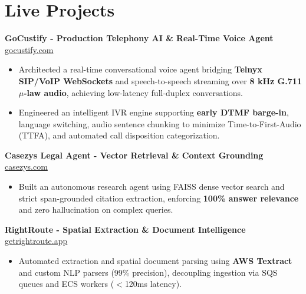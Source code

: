 \documentclass[9.5pt,a4paper]{article}
\begin{document}
\section*{Live Projects}
\noindent
\textbf{GoCustify - Production Telephony AI \& Real-Time Voice Agent} \hfill \href{https://gocustify.com}{gocustify.com}
\begin{itemize}
    \item Architected a real-time conversational voice agent bridging \textbf{Telnyx SIP/VoIP WebSockets} and speech-to-speech streaming over \textbf{8 kHz G.711 $\mu$-law audio}, achieving low-latency full-duplex conversations.
    \item Engineered an intelligent IVR engine supporting \textbf{early DTMF barge-in}, language switching, audio sentence chunking to minimize Time-to-First-Audio (TTFA), and automated call disposition categorization.
\end{itemize}
\vspace{0.6pt}
\noindent
\textbf{Casezys Legal Agent - Vector Retrieval \& Context Grounding} \hfill \href{https://casezys.com}{casezys.com}
\begin{itemize}
    \item Built an autonomous research agent using FAISS dense vector search and strict span-grounded citation extraction, enforcing \textbf{100\% answer relevance} and zero hallucination on complex queries.
\end{itemize}
\vspace{0.6pt}
\noindent
\textbf{RightRoute - Spatial Extraction \& Document Intelligence} \hfill \href{https://getrightroute.app}{getrightroute.app}
\begin{itemize}
    \item Automated extraction and spatial document parsing using \textbf{AWS Textract} and custom NLP parsers (99\% precision), decoupling ingestion via SQS queues and ECS workers ($<$120ms latency).
\end{itemize}
\vspace{0.6pt}
\end{document}
